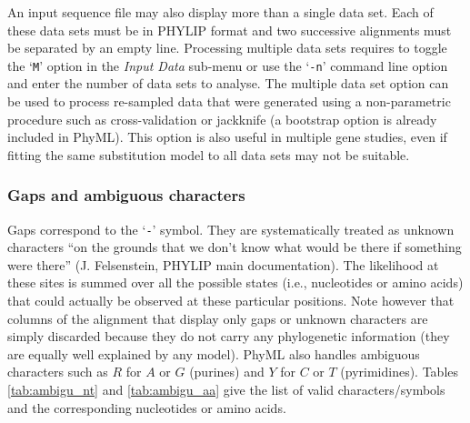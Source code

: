 \documentclass[a4paper,12pt]{article}
\newcommand{\x}[1]{\texttt{#1}}
\begin{document}
An input sequence file may also display more than a single data set. Each of these data sets must be
in  PHYLIP format  and two  successive alignments  must be  separated by  an empty  line. Processing
multiple data sets requires to toggle the `\x{M}' option in the {\em Input Data} sub-menu or use the
`\x{-n}' command line  option and enter the number  of data sets to analyse.  The  multiple data set
option can be used  to process re-sampled data that were generated  using a non-parametric procedure
such  as cross-validation or  jackknife (a  bootstrap option  is already  included in  PhyML).  This
option is also useful  in multiple gene studies, even if fitting the  same substitution model to all
data sets may not be suitable.

\subsubsection{Gaps and ambiguous characters}

Gaps correspond to  the `\x{-}' symbol.  They are systematically treated  as unknown characters ``on
the grounds  that we  don't know what  would be  there if something  were there''  (J.  Felsenstein,
PHYLIP main documentation).   The likelihood at these  sites is summed over all  the possible states
(i.e.,  nucleotides  or   amino  acids)  that  could  actually  be   observed  at  these  particular
positions. Note however that  columns of the alignment that display only  gaps or unknown characters
are simply discarded because  they do not carry any phylogenetic information  (they are equally well
explained  by any  model).  PhyML  also handles  ambiguous characters  such as  $R$ for  $A$  or $G$
(purines) and $Y$ for $C$  or $T$ (pyrimidines).  Tables \ref{tab:ambigu_nt} and \ref{tab:ambigu_aa}
give the list of valid characters/symbols and the corresponding nucleotides or amino acids.
\end{document}

